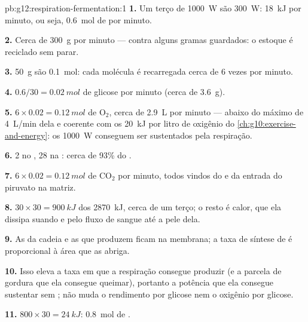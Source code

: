 \begin{solution}{pb:g12:respiration-fermentation:1}
\textbf{1.} Um terço de \qty{1000}{W} são \qty{300}{W}: \qty{18}{kJ}
por minuto, ou seja, \qty{0.6}{mol} de  por minuto.

\textbf{2.} Cerca de \qty{300}{g} por minuto --- contra alguns gramas
guardados: o estoque é reciclado sem parar.

\textbf{3.} \qty{50}{g} são \qty{0.1}{mol}: cada molécula é recarregada
cerca de 6 vezes por minuto.

\textbf{4.} $0.6/30 = \qty{0.02}{mol}$ de glicose por minuto (cerca de
\qty{3.6}{g}).

\textbf{5.} $6 \times 0.02 = \qty{0.12}{mol}$ de $\mathrm{O_2}$, cerca
de \qty{2.9}{L} por minuto --- abaixo do máximo de \qty{4}{L/min} dela
e coerente com os \qty{20}{kJ} por litro de oxigênio do
\cref{ch:g10:exercise-and-energy}: os \qty{1000}{W} conseguem ser
sustentados pela respiração.

\textbf{6.} 2 no , 28 na : cerca de 93\% do .

\textbf{7.} $6 \times 0.02 = \qty{0.12}{mol}$ de $\mathrm{CO_2}$ por
minuto, todos vindos do  e da entrada do piruvato na matriz.

\textbf{8.} $30 \times 30 = \qty{900}{kJ}$ dos \qty{2870}{kJ}, cerca de
um terço; o resto é calor, que ela dissipa suando e pelo fluxo de
sangue até a pele dela.

\textbf{9.} As  da cadeia e as  que produzem  ficam
na membrana; a taxa de síntese de  é proporcional à área que as
abriga.

\textbf{10.} Isso eleva a taxa em que a respiração consegue produzir
 (e a parcela de gordura que ela consegue queimar), portanto a
potência que ela consegue sustentar sem ; não muda o
rendimento por glicose nem o oxigênio por glicose.

\textbf{11.} $800 \times 30 = \qty{24}{kJ}$: \qty{0.8}{mol} de .


\end{solution}
